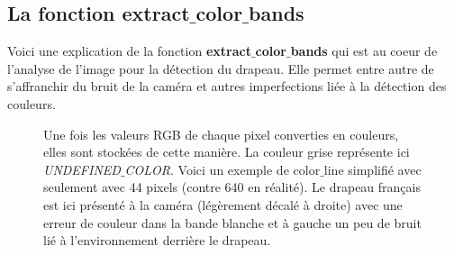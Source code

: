 \documentclass{article}
\begin{document}
    \subsection{La fonction extract$\_$color$\_$bands}
    Voici une explication de la fonction \textbf{extract$\_$color$\_$bands} qui est au coeur de l'analyse de l'image pour la détection du drapeau. Elle permet entre autre de s'affranchir du bruit de la caméra et autres imperfections liée à la détection des couleurs.
    \label{color_line_step1}
    \begin{figure}[!h] %
        \begin{center}
        \end{center}
        \caption{Une fois les valeurs RGB de chaque pixel converties en couleurs, elles sont stockées de cette manière. La couleur grise représente ici \textit{UNDEFINED$\_$COLOR}. Voici un exemple de \textcolor{bleu}{color$\_$line} simplifié avec seulement avec 44 pixels (contre 640 en réalité). Le drapeau français est ici présenté à la caméra (légèrement décalé à droite) avec une erreur de couleur dans la bande blanche et à gauche un peu de bruit lié à l'environnement derrière le drapeau.}
    \end{figure}
\end{document}

